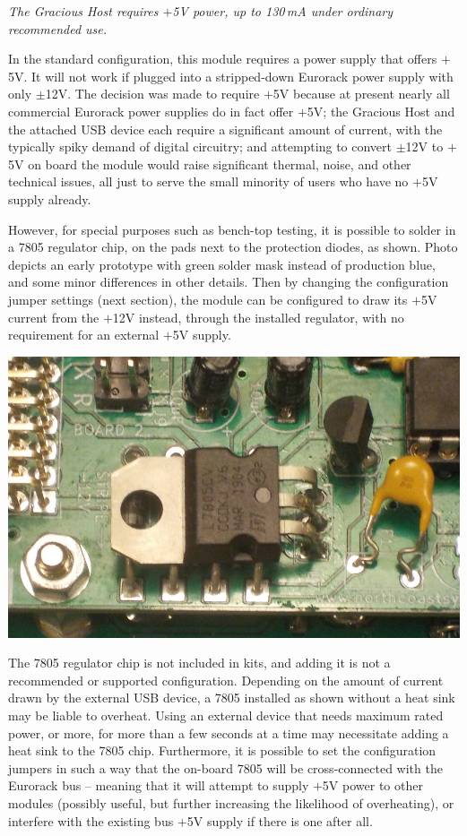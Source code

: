 \emph{The Gracious Host requires $+$5V power, up to 130\,mA under ordinary
recommended use.}

In the standard configuration, this module requires a power supply that
offers $+$5V.  It will not work if plugged into a stripped-down Eurorack
power supply with only $\pm$12V.  The decision was made to require
$+$5V because at present nearly all commercial Eurorack power supplies do in
fact offer $+$5V; the Gracious Host and the attached USB device each require
a significant amount of current, with the typically spiky demand of digital
circuitry; and attempting to convert $\pm$12V to $+$5V on board the module
would raise significant thermal, noise, and other technical issues, all just
to serve the small minority of users who have no $+$5V supply already.

However, for special purposes such as bench-top testing, it is possible to
solder in a 7805 regulator chip, on the pads next to the protection diodes,
as shown.  Photo depicts an early prototype with green solder mask instead
of production blue, and some minor differences in other details.  Then by
changing the configuration jumper settings (next section), the module can be
configured to draw its $+$5V current from the $+$12V instead, through the
installed regulator, with no requirement for an external $+$5V supply.

\nopagebreak\noindent
{\hspace*{\fill}\includegraphics[width=\linewidth]{optional-7805.jpg}\hspace*{\fill}\par} 

The 7805 regulator chip is not included in kits, and adding it is not a
recommended or supported configuration.  Depending on the amount of current
drawn by the external USB device, a 7805 installed as shown without a heat
sink may be liable to overheat.  Using an external device that needs maximum
rated power, or more, for more than a few seconds at a time may necessitate
adding a heat sink to the 7805 chip.  Furthermore, it is possible to set the
configuration jumpers in such a way that the on-board 7805 will be
cross-connected with the Eurorack bus -- meaning that it will attempt to
supply $+$5V power to other modules (possibly useful, but further increasing
the likelihood of overheating), or interfere with the existing bus $+$5V
supply if there is one after all.

